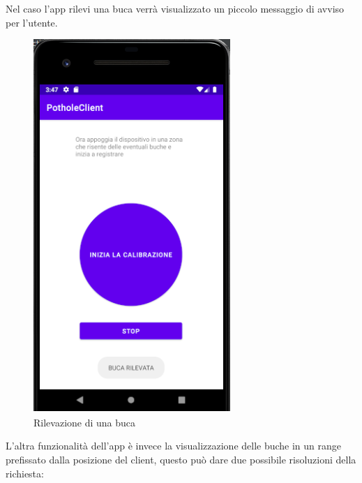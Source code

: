 \documentclass[a4paper,11pt]{report}
\begin{document}
Nel caso l'app rilevi una buca verrà visualizzato un piccolo messaggio di avviso per l'utente.
\begin{figure} [H]
\centering
\includegraphics[scale = 0.65]{potholes_detected}
\caption{Rilevazione di una buca}
\end{figure}
\newpage
L'altra funzionalità dell'app è invece la visualizzazione delle buche in un range prefissato dalla posizione del client, questo può dare due possibile risoluzioni della richiesta: 
\end{document}
